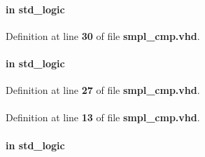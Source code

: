 \paragraph[{mimo\+\_\+en}]{ {\bfseries \textcolor{keywordflow}{in}\textcolor{vhdlchar}{ }} {\bfseries \textcolor{comment}{std\+\_\+logic}\textcolor{vhdlchar}{ }} \hspace{0.3cm}{\ttfamily [Port]}}\label{classsmpl__cmp_a0c57670aee4f9fbfa3c286573012965a}


Definition at line {\bf 30} of file {\bf smpl\+\_\+cmp.\+vhd}.

\paragraph[{mode}]{ {\bfseries \textcolor{keywordflow}{in}\textcolor{vhdlchar}{ }} {\bfseries \textcolor{comment}{std\+\_\+logic}\textcolor{vhdlchar}{ }} \hspace{0.3cm}{\ttfamily [Port]}}\label{classsmpl__cmp_a219fe733f94bce997e904a6e45b1ac19}


Definition at line {\bf 27} of file {\bf smpl\+\_\+cmp.\+vhd}.

\paragraph[{numeric\+\_\+std}]{\hspace{0.3cm}{\ttfamily [Package]}}\label{classsmpl__cmp_a2edc34402b573437d5f25fa90ba4013e}


Definition at line {\bf 13} of file {\bf smpl\+\_\+cmp.\+vhd}.

\paragraph[{reset\+\_\+n}]{ {\bfseries \textcolor{keywordflow}{in}\textcolor{vhdlchar}{ }} {\bfseries \textcolor{comment}{std\+\_\+logic}\textcolor{vhdlchar}{ }} \hspace{0.3cm}{\ttfamily [Port]}}\label{classsmpl__cmp_a446ea52ed8c4a84181a47d9165ce41a5}


